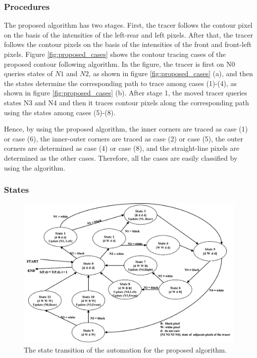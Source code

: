 \subsubsection{Procedures}

The proposed algorithm has two stages. First, the tracer follows the contour pixel on the basis of the intensities of the left-rear and left pixels. After that, the tracer follows the contour pixels on the basis of the intensities of the front and front-left pixels. Figure \ref{fig:proposed_cases} shows the contour tracing cases of the proposed contour following algorithm. In the figure, the tracer is first on N0 queries states of $N1$ and $N2$, as shown in figure \ref{fig:proposed_cases} (a), and then the states determine the corresponding  path to trace among cases (1)-(4), as shown in figure \ref{fig:proposed_cases} (b). After stage 1, the moved tracer queries states N3 and N4 and then it traces contour pixels along the corresponding path using the states among cases (5)-(8). 

Hence, by using the proposed algorithm, the inner corners are traced as case (1) or case (6), the inner-outer corners are traced as case (2) or case (5), the outer corners are determined as case (4) or case (8), and the straight-line pixels are determined as the other cases. Therefore, all the cases are easily classified by using the algorithm. 




\subsubsection{States}

\begin{figure}[htbp]
	\centering
	\includegraphics[width=1.0\textwidth]{4.Proposed/state.png}
	\caption{The state transition of the automation for the proposed algorithm.}
	\label{fig:state}
\end{figure}

